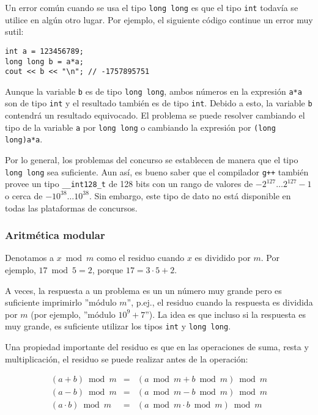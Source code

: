 Un error común cuando se usa el tipo \texttt{long long}
es que el tipo \texttt{int} todavía se utilice 
en algún otro lugar.
Por ejemplo, el siguiente código continue
un error muy sutil:

\begin{lstlisting}
int a = 123456789;
long long b = a*a;
cout << b << "\n"; // -1757895751
\end{lstlisting}

Aunque la variable \texttt{b} es de tipo \texttt{long long},
ambos números en la expresión \texttt{a*a}
son de tipo \texttt{int} y el resultado
también es de tipo \texttt{int}.
Debido a esto, la variable \texttt{b}
contendrá un resultado equivocado.
El problema se puede resolver cambiando el tipo
de la variable \texttt{a} por \texttt{long long} o
cambiando la expresión por \texttt{(long long)a*a}.

Por lo general, los problemas del concurso se establecen de manera que
el tipo \texttt{long long} sea suficiente.
Aun así, es bueno saber que
el compilador \texttt{g++} también provee
un tipo \texttt{\_\_int128\_t} de 128 bits
con un rango de valores de
$-2^{127} \ldots 2^{127}-1$ o cerca de $-10^{38} \ldots 10^{38}$.
Sin embargo, este tipo de dato no está disponible en todas las plataformas de concursos.

\subsubsection{Aritmética modular}


Denotamos a $x \bmod m$ como el residuo
cuando $x$ es dividido por $m$.
Por ejemplo, $17 \bmod 5 = 2$,
porque $17 = 3 \cdot 5 + 2$.

A veces, la respuesta a un problema es un
un número muy grande pero es suficiente
imprimirlo ''módulo $m$'', p.ej.,
el residuo cuando la respuesta es dividida por $m$
(por ejemplo, ''módulo $10^9+7$'').
La idea es que incluso si la respuesta
es muy grande,
es suficiente utilizar los tipos
\texttt{int} y \texttt{long long}.

Una propiedad importante del residuo es que
en las operaciones de suma, resta y multiplicación,
el residuo se puede realizar antes de la operación:

\[
\begin{array}{rcr}
(a+b) \bmod m & = & (a \bmod m + b \bmod m) \bmod m \\
(a-b) \bmod m & = & (a \bmod m - b \bmod m) \bmod m \\
(a \cdot b) \bmod m & = & (a \bmod m \cdot b \bmod m) \bmod m
\end{array}
\]

